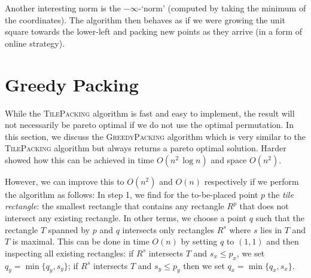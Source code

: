 \documentclass[11pt, a4paper, twocolumn]{article}
\begin{document}
Another interesting norm is the $-\infty$-`norm'
(computed by taking the minimum of the coordinates). The algorithm then
behaves as if we were growing the unit square towards the lower-left
and packing new points as they arrive (in a form of online strategy).




\section{Greedy Packing}
\label{greedy}

While the \textsc{TilePacking} algorithm is fast and easy to implement,
the result will not necessarily be pareto optimal if we do not use the optimal permutation.
In this section, we discuss the \textsc{GreedyPacking} algorithm which is very similar
to the \textsc{TilePacking} algorithm but always returns a pareto optimal solution.
Harder \cite{harder2019anchoredrectanglecover} showed how this can be achieved in
time $O(n^2\, \log n)$ and space $O(n^2)$.

However, we can improve this to $O(n^2)$ and $O(n)$ respectively if we perform the algorithm as follows:
In step 1, we find for the to-be-placed point $p$ the \textit{tile rectangle}: the smallest rectangle
that contains any rectangle $R^p$ that does not intersect any existing rectangle. In other terms,
we choose a point $q$ such that the rectangle $T$ spanned by $p$ and $q$ intersects only rectangles $R^s$
where $s$ lies in $T$ and $T$ is maximal. This can be done in time $O(n)$ by setting $q$ to $(1,1)$
and then inspecting all existing rectangles: if $R^s$ intersects $T$ and $s_x \leq p_x$,
we set $q_y = \min \{q_y, s_y\}$; if $R^s$ intersects $T$ and $s_y \leq p_y$ then we set $q_x = \min \{q_x, s_x\}$.
\end{document}
